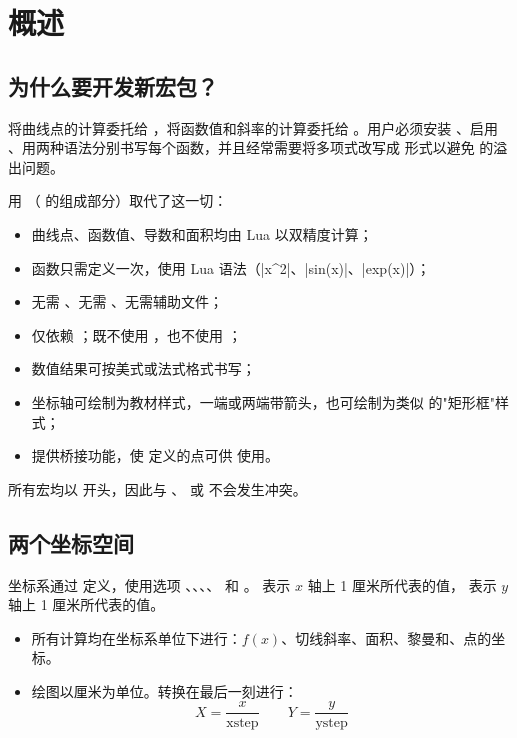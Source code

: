 \section{概述}

\subsection{为什么要开发新宏包？}

 将曲线点的计算委托给 ，将函数值和斜率的计算委托给 。用户必须安装 、启用 、用两种语法分别书写每个函数，并且经常需要将多项式改写成  形式以避免  的溢出问题。

 用 （ 的组成部分）取代了这一切：
\begin{itemize}
  \item 曲线点、函数值、导数和面积均由 Lua 以双精度计算；
  \item 函数只需定义一次，使用 Lua 语法（|x^2|、|sin(x)|、|exp(x)|）；
  \item 无需 、无需 、无需辅助文件；
  \item {} 仅依赖 \TIKZ；既不使用 ，也不使用 ；
  \item 数值结果可按美式或法式格式书写；
  \item 坐标轴可绘制为教材样式，一端或两端带箭头，也可绘制为类似  的"矩形框"样式；
  \item 提供桥接功能，使  定义的点可供  使用。
\end{itemize}

所有宏均以  开头，因此与 、 或  不会发生冲突。

\subsection{两个坐标空间}

坐标系通过  定义，使用选项 、、、、 和 。 表示 $x$ 轴上 1 厘米所代表的值， 表示 $y$ 轴上 1 厘米所代表的值。

\begin{itemize}
  \item 所有计算均在坐标系单位下进行：$f(x)$、切线斜率、面积、黎曼和、点的坐标。
  \item 绘图以厘米为单位。转换在最后一刻进行：
  \[ X = \frac{x}{\text{xstep}} \qquad Y = \frac{y}{\text{ystep}} \]
\end{itemize}

